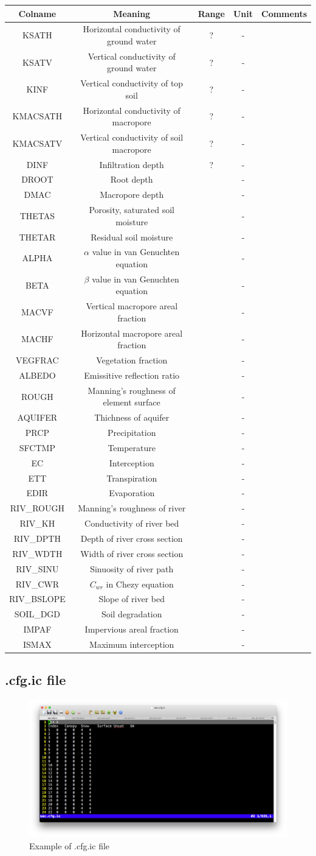 \documentclass[]{scrbook}
\begin{document}
\begin{longtable}[]{@{}ccccc@{}}
\toprule
Colname & Meaning & Range & Unit & Comments\tabularnewline
\midrule
\endhead
KSATH & Horizontal conductivity of ground water & ? & - &\tabularnewline
KSATV & Vertical conductivity of ground water & ? & - &\tabularnewline
KINF & Vertical conductivity of top soil & ? & - &\tabularnewline
KMACSATH & Horizontal conductivity of macropore & ? & - &\tabularnewline
KMACSATV & Vertical conductivity of soil macropore & ? & -
&\tabularnewline
DINF & Infiltration depth & ? & - &\tabularnewline
DROOT & Root depth & & - &\tabularnewline
DMAC & Macropore depth & & - &\tabularnewline
THETAS & Porosity, saturated soil moisture & & - &\tabularnewline
THETAR & Residual soil moisture & & - &\tabularnewline
ALPHA & \(\alpha\) value in van Genuchten equation & & -
&\tabularnewline
BETA & \(\beta\) value in van Genuchten equation & & - &\tabularnewline
MACVF & Vertical macropore areal fraction & & - &\tabularnewline
MACHF & Horizontal macropore areal fraction & & - &\tabularnewline
VEGFRAC & Vegetation fraction & & - &\tabularnewline
ALBEDO & Emissitive reflection ratio & & - &\tabularnewline
ROUGH & Manning's roughness of element surface & & - &\tabularnewline
AQUIFER & Thichness of aquifer & & - &\tabularnewline
PRCP & Precipitation & & - &\tabularnewline
SFCTMP & Temperature & & - &\tabularnewline
EC & Interception & & - &\tabularnewline
ETT & Transpiration & & - &\tabularnewline
EDIR & Evaporation & & - &\tabularnewline
RIV\_ROUGH & Manning's roughness of river & & - &\tabularnewline
RIV\_KH & Conductivity of river bed & & - &\tabularnewline
RIV\_DPTH & Depth of river cross section & & - &\tabularnewline
RIV\_WDTH & Width of river cross section & & - &\tabularnewline
RIV\_SINU & Sinuosity of river path & & - &\tabularnewline
RIV\_CWR & \(C_{wr}\) in Chezy equation & & - &\tabularnewline
RIV\_BSLOPE & Slope of river bed & & - &\tabularnewline
SOIL\_DGD & Soil degradation & & - &\tabularnewline
IMPAF & Impervious areal fraction & & - &\tabularnewline
ISMAX & Maximum interception & & - &\tabularnewline
\bottomrule
\end{longtable}

\subsection{.cfg.ic file}\label{cfg.ic-file}

\begin{figure}
\centering
\includegraphics{Fig/IO/cfg.ic.png}
\caption{Example of .cfg.ic file}
\end{figure}
\end{document}

